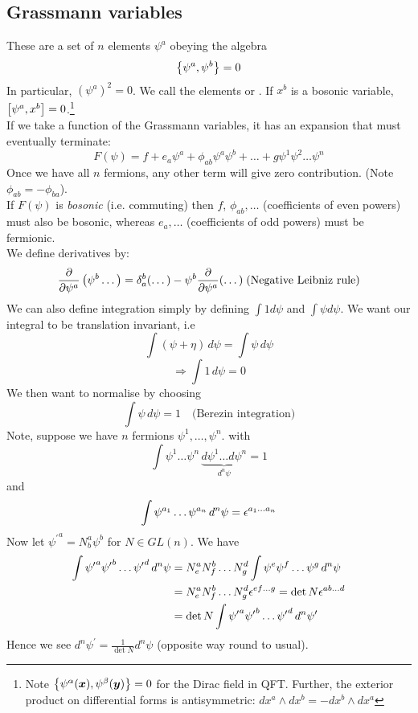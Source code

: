 \documentclass{article}
\begin{document}
\subsection{Grassmann variables}
These are a set of $n$ elements $\psi^a$ obeying the algebra 
\[
\acomm[\psi^a]{\psi^b} = 0
\]
In particular, $(\psi^a)^2=0$. We call the elements  or . If $x^b$ is a bosonic variable, $\comm[\psi^a]{x^b}=0$.\footnote{Note $\acomm[\psi^\alpha(\bm{x})]{\psi^\beta(\bm{y})} = 0$ for the Dirac field in QFT. Further, the exterior product on differential forms is antisymmetric: $dx^a \wedge dx^b = -dx^b \wedge dx^a$} \\
If we take a function of the Grassmann variables, it has an expansion that must eventually terminate: 
\[
F(\psi) = f + e_a \psi^a + \phi_{ab} \psi^a \psi^b + \dots +g \psi^1\psi^2\dots\psi^n
\]
Once we have all $n$ fermions, any other term will give zero contribution. (Note $\phi_{ab} = -\phi_{ba}$). \\
If $F(\psi)$ is \emph{bosonic} (i.e. commuting) then $f$, $\phi_{ab},\dots$ (coefficients of even powers) must also be bosonic, whereas $e_a,\dots$ (coefficients of odd powers) must be fermionic. \\
We define derivatives by:
\[
\pd{\psi^a}\left(\psi^b \dots \right) = \delta^b_a ( \dots) - \psi^b \pd{\psi^a} (\dots) \; \text{(Negative Leibniz rule)}
\]
We can also define integration simply by defining $\int 1 d\psi$ and $\int \psi d\psi$. We want our integral to be translation invariant, i.e 
\[
\int (\psi + \eta) \, d\psi = \int \psi \, d\psi
\]
\[
\Rightarrow \int 1 \, d\psi = 0 
\]
We then want to normalise by choosing 
\[
\int \psi \, d\psi = 1 \quad \text{(Berezin integration)}
\]
Note, suppose we have $n$ fermions $\psi^1, \dots, \psi^n$. with 
\[
\int \psi^1 \dots \psi^n \, \underbrace{ d\psi^1 \dots d\psi^n}_{d^n \psi} = 1 
\]
and 
\[
\int \psi^{a_1} \dots \psi^{a_n} \, d^n \psi = \eps^{a_1 \dots a_n}
\]
Now let ${\psi^\prime}^a=N^a_b \psi^b$ for $N\in GL(n)$. We have 
\begin{align*}
    \int {\psi^\prime}^a {\psi^\prime}^b \dots {\psi^\prime}^d \, d^n \psi &= N^a_e N^b_f \dots N^d_g \int \psi^e \psi^f \dots \psi^g \, d^n \psi \\
    &= N^a_e N^b_f \dots N^d_g \eps^{ef\dots g} = \det N \eps^{ab\dots d} \\
    &= \det N \int {\psi^\prime}^a {\psi^\prime}^b \dots {\psi^\prime}^d \, d^n \psi^\prime 
\end{align*}
Hence we see $d^n \psi^\prime = \frac{1}{\det N} d^n \psi$ (opposite way round to usual).
\end{document}
